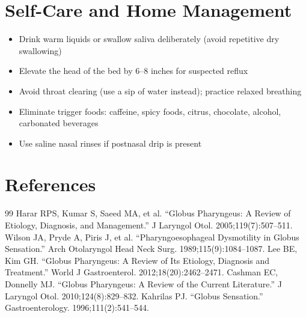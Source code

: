\section*{Self-Care and Home Management}
\begin{itemize}
  \item Drink warm liquids or swallow saliva deliberately (avoid repetitive dry swallowing)
  \item Elevate the head of the bed by 6--8 inches for suspected reflux
  \item Avoid throat clearing (use a sip of water instead); practice relaxed breathing
  \item Eliminate trigger foods: caffeine, spicy foods, citrus, chocolate, alcohol, carbonated beverages
  \item Use saline nasal rinses if postnasal drip is present
\end{itemize}

\section*{References}
\begin{thebibliography}{99}
 Harar RPS, Kumar S, Saeed MA, et al. ``Globus Pharyngeus: A Review of Etiology, Diagnosis, and Management.'' J Laryngol Otol. 2005;119(7):507--511.
 Wilson JA, Pryde A, Piris J, et al. ``Pharyngoesophageal Dysmotility in Globus Sensation.'' Arch Otolaryngol Head Neck Surg. 1989;115(9):1084--1087.
 Lee BE, Kim GH. ``Globus Pharyngeus: A Review of Its Etiology, Diagnosis and Treatment.'' World J Gastroenterol. 2012;18(20):2462--2471.
 Cashman EC, Donnelly MJ. ``Globus Pharyngeus: A Review of the Current Literature.'' J Laryngol Otol. 2010;124(8):829--832.
 Kahrilas PJ. ``Globus Sensation.'' Gastroenterology. 1996;111(2):541--544.
\end{thebibliography}
